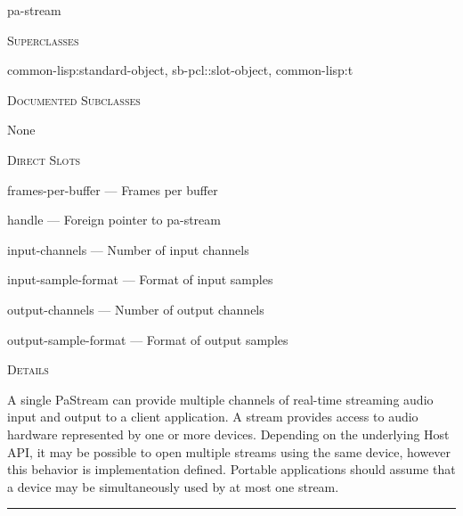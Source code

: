 \documentclass[a4paper]{report}
\begin{document}
    \label{portaudio__class__pa-stream}
    \begin{defun}[Class]
    pa-stream


      
    \bigskip
    \textsc{Superclasses}

\color[rgb]{0.5,0.5,0.5}common-lisp:standard-object\color[rgb]{0,0,0}, \color[rgb]{0.5,0.5,0.5}sb-pcl::slot-object\color[rgb]{0,0,0}, \color[rgb]{0.5,0.5,0.5}common-lisp:t\color[rgb]{0,0,0}


      
    \bigskip
    \textsc{Documented Subclasses}


	    None
	  


	
    \bigskip
    \textsc{Direct Slots}

frames-per-buffer --- Frames per buffer

handle --- Foreign pointer to pa-stream

input-channels --- Number of input channels

input-sample-format --- Format of input samples

output-channels --- Number of output channels

output-sample-format --- Format of output samples




	
    \bigskip
    \textsc{Details}

A single PaStream can provide multiple channels of real-time streaming audio input and output to a client application. A stream provides access to audio hardware represented by one or more devices. Depending on the underlying Host API, it may be possible to open multiple streams using the same device, however this behavior is implementation defined. Portable applications should assume that a device may be simultaneously used by at most one stream.


    
    \end{defun}
  
  

    \rule{\linewidth}{0.1mm}
    
\end{document}
